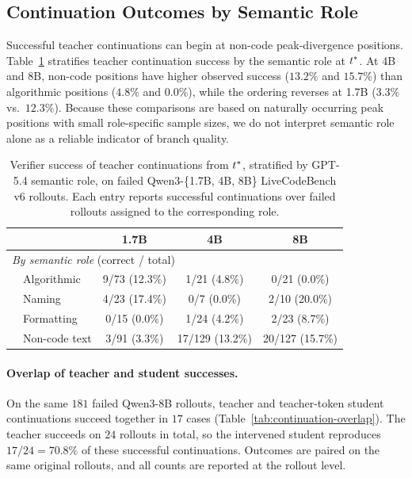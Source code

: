 \subsection{Continuation Outcomes by Semantic Role}
\label{app:cross-tab}

Successful teacher continuations can begin at non-code peak-divergence positions. Table~\ref{tab:cross-tab} stratifies teacher continuation success by the semantic role at $t^{*}$. At 4B and 8B, non-code positions have higher observed success ($13.2\%$ and $15.7\%$) than algorithmic positions ($4.8\%$ and $0.0\%$), while the ordering reverses at 1.7B ($3.3\%$ vs.\ $12.3\%$). Because these comparisons are based on naturally occurring peak positions with small role-specific sample sizes, we do not interpret semantic role alone as a reliable indicator of branch quality.

\begin{table}[ht]
\caption{Verifier success of teacher continuations from $t^{*}$, stratified by GPT-5.4 semantic role, on failed Qwen3-\{1.7B, 4B, 8B\} LiveCodeBench v6 rollouts. Each entry reports successful continuations over failed rollouts assigned to the corresponding role.}  \label{tab:cross-tab}
  \centering
  \small
  \begin{tabular}{llccc}
    \toprule
    & & 1.7B & 4B & 8B \\
    \midrule
    \multicolumn{5}{l}{\textit{By semantic role}
\hfill \scriptsize(correct / total)} \\
    & Algorithmic  & 9/73 (12.3\%) & 1/21 (4.8\%)   & 0/21 (0.0\%) \\
    & Naming  & 4/23 (17.4\%) & 0/7 (0.0\%)    & 2/10 (20.0\%) \\
    & Formatting  & 0/15 (0.0\%)  & 1/24 (4.2\%)   & 2/23 (8.7\%) \\
    & Non-code text  & 3/91 (3.3\%)  & 17/129 (13.2\%) & 20/127 (15.7\%) \\
    \bottomrule
  \end{tabular}
\end{table}

\paragraph{Overlap of teacher and student successes.}
On the same $181$ failed Qwen3-8B rollouts, teacher and teacher-token student continuations succeed together in $17$ cases (Table~\ref{tab:continuation-overlap}). The teacher succeeds on $24$ rollouts in total, so the intervened student reproduces $17/24=70.8\%$ of these successful continuations. Outcomes are paired on the same original rollouts, and all counts are reported at the rollout level.

